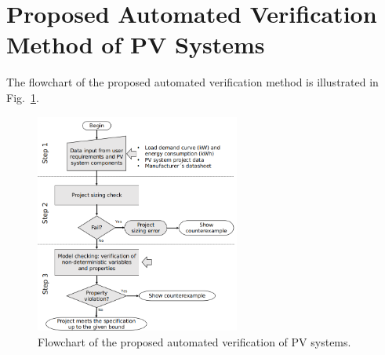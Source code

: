 \documentclass[review]{elsarticle}
\begin{document}
\section{Proposed Automated Verification Method of PV Systems}
\label{sec:Methodology}
%
%
%
%
The flowchart of the proposed automated verification method is illustrated in Fig.~\ref{fig:flowchartgeneral}. 

\begin{figure}[h]
\includegraphics[width=0.6\textwidth]{flowchart_verification5.png}
\centering
\caption{Flowchart of the proposed automated verification of PV systems.}
\label{fig:flowchartgeneral}
\end{figure}
\end{document}
